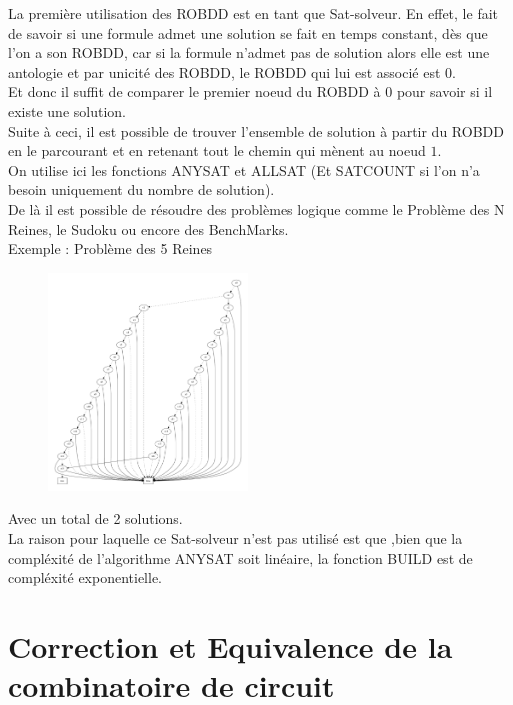 \documentclass[a4paper, oneside]{report}
\begin{document}
La première utilisation des ROBDD est en tant que Sat-solveur. En effet, le fait de savoir si une formule admet une solution se fait en temps constant, dès que l'on a son ROBDD, car si la formule n'admet pas de solution alors elle est une antologie et par unicité des ROBDD, le ROBDD qui lui est associé est $0$.\\
Et donc il suffit de comparer le premier noeud du ROBDD à 0 pour savoir si il existe une solution.\\

Suite à ceci, il est possible de trouver l'ensemble de solution à partir du ROBDD en le parcourant et en retenant tout le chemin qui mènent au noeud $1$.\\

On utilise ici les fonctions ANYSAT et ALLSAT (Et SATCOUNT si l'on n'a besoin uniquement du nombre de solution).\\

De là il est possible de résoudre des problèmes logique comme le Problème des N Reines, le Sudoku ou encore des BenchMarks.\\

Exemple : Problème des 5 Reines\\

\begin{figure}[h]
\includegraphics[width=200px]{exemple/queen_4.pdf}
\end{figure}

Avec un total de 2 solutions.\\

La raison pour laquelle ce Sat-solveur n'est pas utilisé est que ,bien que la compléxité de l'algorithme ANYSAT soit linéaire, la fonction BUILD est de compléxité exponentielle.

\newpage

\section{Correction et Equivalence de la combinatoire de circuit}
\end{document}
